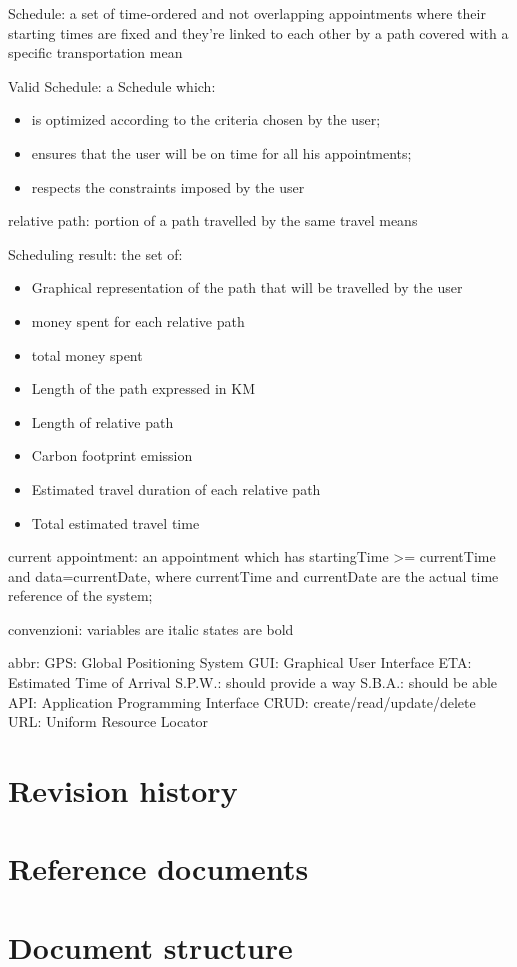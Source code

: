 Schedule: a set of time-ordered and not overlapping appointments where their starting times are fixed and they're linked to each other by a path covered with a specific transportation mean

Valid Schedule: a Schedule which:
\begin{itemize}
\item is optimized according to the criteria chosen by the user;
\item ensures that the user will be on time for all his appointments;
\item respects the constraints imposed by the user
\end{itemize}

relative path: portion of a path travelled by the same travel means 

Scheduling result: the set of:
\begin{itemize}
\item Graphical representation of the path that will be travelled by the user
\item money spent for each relative path
\item total money spent 
\item Length of the path expressed in KM
\item Length of relative path 
\item Carbon footprint emission
\item Estimated travel duration of each relative path
\item Total estimated travel time
\end{itemize}

current appointment: an appointment which has startingTime >= currentTime and data=currentDate, where currentTime and  currentDate are the actual time reference of the system;

convenzioni:
variables are italic
states are bold

abbr:
GPS: Global Positioning System
GUI: Graphical User Interface
ETA: Estimated Time of Arrival
S.P.W.: should provide a way
S.B.A.: should be able 
API: Application Programming Interface
CRUD: create/read/update/delete
URL: Uniform Resource Locator


\section{Revision history}

\section{Reference documents}

\section{Document structure}
